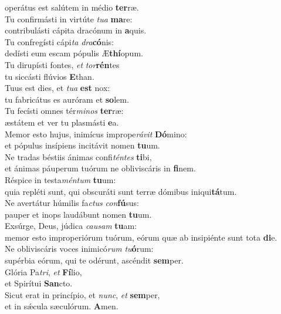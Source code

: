 \oddverse operátus est salútem in médio \textbf{ter}ræ.\\
\evenverse Tu confirmásti in virtúte \textit{tu}\textit{a} \textbf{ma}re:~\*\\
\evenverse contribulásti cápita dracónum in \textbf{a}quis.\\
\oddverse Tu confregísti cápi\textit{ta} \textit{dra}\textbf{có}nis:~\*\\
\oddverse dedísti eum escam pópulis Æ\textbf{thí}opum.\\
\evenverse Tu dirupísti fontes, \textit{et} \textit{tor}\textbf{rén}tes~\*\\
\evenverse tu siccásti flúvios \textbf{E}than.\\
\oddverse Tuus est dies, et \textit{tu}\textit{a} \textbf{est} nox:~\*\\
\oddverse tu fabricátus es auróram et \textbf{so}lem.\\
\evenverse Tu fecísti omnes tér\textit{mi}\textit{nos} \textbf{ter}ræ:~\*\\
\evenverse æstátem et ver tu plasmásti \textbf{e}a.\\
\oddverse Memor esto hujus, inimícus imprope\textit{rá}\textit{vit} \textbf{Dó}mino:~\*\\
\oddverse et pópulus insípiens incitávit nomen \textbf{tu}um.\\
\evenverse Ne tradas béstiis ánimas confi\textit{tén}\textit{tes} \textbf{ti}bi,~\*\\
\evenverse et ánimas páuperum tuórum ne obliviscáris in \textbf{fi}nem.\\
\oddverse Réspice in testa\textit{mén}\textit{tum} \textbf{tu}um:~\*\\
\oddverse quia repléti sunt, qui obscuráti sunt terræ dómibus iniqui\textbf{tá}tum.\\
\evenverse Ne avertátur húmilis fa\textit{ctus} \textit{con}\textbf{fú}sus:~\*\\
\evenverse pauper et inops laudábunt nomen \textbf{tu}um.\\
\oddverse Exsúrge, Deus, júdica \textit{cau}\textit{sam} \textbf{tu}am:~\*\\
\oddverse memor esto improperiórum tuórum, eórum quæ ab insipiénte sunt tota \textbf{di}e.\\
\evenverse Ne obliviscáris voces inimicó\textit{rum} \textit{tu}\textbf{ó}rum:~\*\\
\evenverse supérbia eórum, qui te odérunt, ascéndit \textbf{sem}per.\\
\oddverse Glória Pa\textit{tri}, \textit{et} \textbf{Fí}lio,~\*\\
\oddverse et Spirítui \textbf{San}cto.\\
\evenverse Sicut erat in princípio, et \textit{nunc}, \textit{et} \textbf{sem}per,~\*\\
\evenverse et in sǽcula sæculórum. \textbf{A}men.\\
